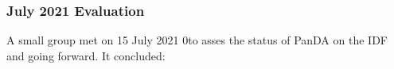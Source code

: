 \subsubsection{July 2021 Evaluation}
A small group met on 15 July 2021 0to asses the status of PanDA on the IDF and going forward. It concluded:
